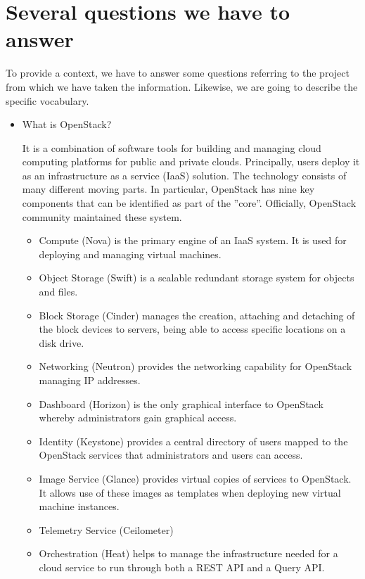 \documentclass[a4paper]{article}
\begin{document}
\section{Several questions we have to answer}

To provide a context, we have to answer some questions referring to the project from which we have taken the information. Likewise, we are going to describe the specific vocabulary.
\begin{itemize}
\item What is OpenStack?

It is a combination of software tools for building and managing cloud computing platforms for public and private clouds. Principally, users deploy it as an infrastructure as a service (IaaS) solution. The technology consists of many different moving parts. In particular, OpenStack has nine key components that can be identified as part of the ”core”. Officially, OpenStack community maintained these system. 

\begin{itemize}
    \item Compute (Nova) is the primary engine of an IaaS system. It is used for deploying and managing virtual machines.
    \item Object Storage (Swift) is a scalable redundant storage system for objects and files.
    \item Block Storage (Cinder) manages the creation, attaching and detaching of the block devices to servers, being able to access specific locations on a disk drive.
    \item Networking (Neutron) provides the networking capability for OpenStack managing IP addresses.
    \item Dashboard (Horizon) is the only graphical interface to OpenStack whereby administrators gain graphical access.
    \item Identity (Keystone) provides a central directory of users mapped to the OpenStack services that administrators and users can access.
    \item  Image Service (Glance) provides virtual copies of services to OpenStack. It allows use of these images as templates when deploying new virtual machine instances. 
    \item Telemetry Service (Ceilometer) 
    \item Orchestration (Heat) helps to manage the infrastructure needed for a cloud service to run through both a REST API and a Query API.
\end{itemize}


\end{itemize}
\end{document}
